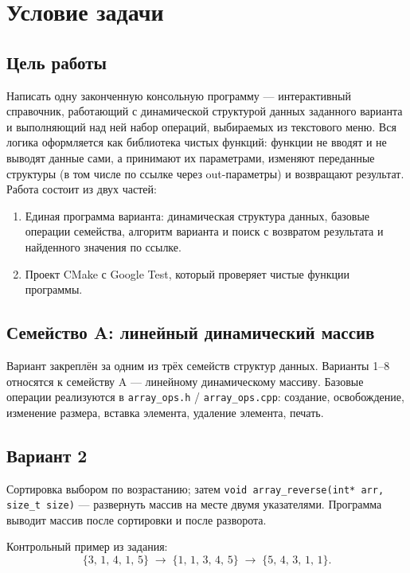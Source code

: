\section{Условие задачи}

\subsection{Цель работы}

Написать одну законченную консольную программу --- интерактивный справочник,
работающий с динамической структурой данных заданного варианта и выполняющий
над ней набор операций, выбираемых из текстового меню. Вся логика оформляется
как библиотека чистых функций: функции не вводят и не выводят данные сами, а
принимают их параметрами, изменяют переданные структуры (в том числе по ссылке
через out-параметры) и возвращают результат. Работа состоит из двух частей:

\begin{enumerate}
  \item Единая программа варианта: динамическая структура данных, базовые
        операции семейства, алгоритм варианта и поиск с возвратом результата и
        найденного значения по ссылке.
  \item Проект CMake с Google Test, который проверяет чистые функции программы.
\end{enumerate}

\subsection{Семейство A: линейный динамический массив}

Вариант закреплён за одним из трёх семейств структур данных. Варианты 1--8
относятся к семейству A --- линейному динамическому массиву. Базовые операции
реализуются в \texttt{array\_ops.h} / \texttt{array\_ops.cpp}: создание,
освобождение, изменение размера, вставка элемента, удаление элемента, печать.

\subsection{Вариант 2}

Сортировка выбором по возрастанию; затем
\texttt{void array\_reverse(int* arr, size\_t size)} --- развернуть массив
на месте двумя указателями. Программа выводит массив после сортировки и после
разворота.

Контрольный пример из задания:
\[
  \{3,\,1,\,4,\,1,\,5\} \;\longrightarrow\; \{1,\,1,\,3,\,4,\,5\}
  \;\longrightarrow\; \{5,\,4,\,3,\,1,\,1\}.
\]

